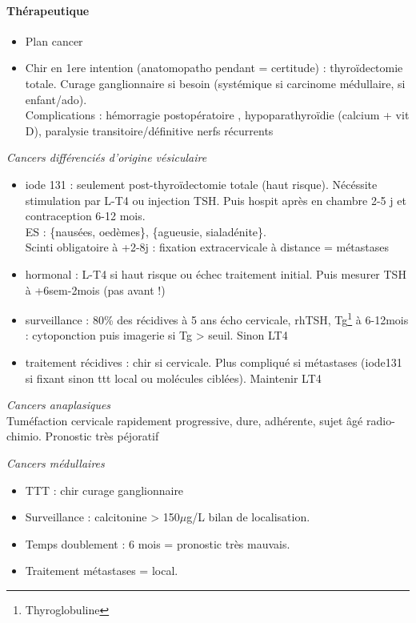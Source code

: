 \documentclass[11pt]{article}
\begin{document}
\paragraph{Thérapeutique}
\label{sec:orgd2d6374}
\begin{itemize}
\item Plan cancer
\item Chir en 1ere intention (anatomopatho pendant = certitude) : thyroïdectomie
totale. Curage ganglionnaire si besoin (systémique si carcinome médullaire,
si enfant/ado). \\
Complications : hémorragie postopératoire \faBomb,  hypoparathyroïdie (calcium + vit D), paralysie transitoire/définitive nerfs récurrents
\end{itemize}
\vspace*{10pt}

\emph{Cancers différenciés d'origine vésiculaire}
\begin{itemize}
\item iode 131 : seulement post-thyroïdectomie totale (haut risque). Nécéssite
stimulation par L-T4 ou injection TSH. Puis hospit après en chambre 2-5 j
et contraception 6-12 mois. \\
ES : \{nausées, oedèmes\}, \{agueusie, sialadénite\}. \\
Scinti  obligatoire à +2-8j : fixation extracervicale à  distance = métastases
\item hormonal : L-T4 si haut risque ou échec traitement initial. Puis mesurer TSH à
+6sem-2mois (pas avant !)
\item surveillance : 80\% des récidives à 5 ans \thus écho cervicale, rhTSH,
Tg\footnote{Thyroglobuline} à 6-12mois : cytoponction puis imagerie si Tg > seuil. Sinon \dec LT4
\item traitement récidives : chir si cervicale. Plus compliqué si métastases
(iode131 si fixant sinon ttt local ou molécules ciblées). Maintenir LT4
\end{itemize}

\emph{Cancers anaplasiques}\\
Tuméfaction cervicale rapidement progressive, dure, adhérente, sujet âgé \thus radio-chimio. Pronostic très péjoratif

\emph{Cancers médullaires}
\begin{itemize}
\item TTT : chir \textpm{} curage ganglionnaire
\item Surveillance : calcitonine > 150\(\mu\)g/L \thus bilan de localisation.
\item Temps doublement : 6 mois = pronostic très mauvais.
\item Traitement métastases = local.
\end{itemize}
\end{document}
